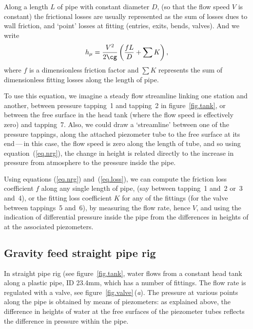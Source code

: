 \documentclass[a4paper,11pt]{article} \pagestyle{plain}
\begin{document}
Along a length $L$ of pipe with constant diameter $D$, (so that the
flow speed $V$ is constant) the frictional losses are usually
represented as the sum of losses dues to wall friction, and `point'
losses at fitting (entries, exits, bends, valves). And we write
\begin{equation}
h_\mu = \frac{V^2}{2\cg}\left(\frac{fL}{D}+\sum K\right),
\label{eq.loss}
\end{equation}
where $f$ is a dimensionless friction factor and $\sum K$ represents
the sum of dimensionless fitting losses along the length of pipe.

To use this equation, we imagine a steady flow streamline linking one
station and another, \eg between pressure tapping~1 and tapping~2 in
figure~\ref{fig.tank}, or between the free surface in the head tank
(where the flow speed is effectively zero) and tapping~7. Also, we
could draw a `streamline' between one of the pressure tappings, along
the attached piezometer tube to the free surface at its end\,---\,in
this case, the flow speed is zero along the length of tube, and so
using equation~(\ref{eq.nrg}), the change in height is related
directly to the increase in pressure from atmosphere to the pressure
inside the pipe.

Using equations (\ref{eq.nrg}) and~(\ref{eq.loss}), we can compute the
friction loss coefficient $f$ along any single length of pipe, (say
between tapping~1 and~2 or~3 and~4), or the fitting loss coefficient
$K$ for any of the fittings (\eg for the valve between tappings~5
and~6), by measuring the flow rate, hence $V$, and using the
indication of differential pressure inside the pipe from the
differences in heights of at the associated piezometers.

\subsection*{Gravity feed straight pipe rig}

In straight pipe rig (see figure~\ref{fig.tank}, water flows from a
constant head tank along a plastic pipe, ID 23.4mm, which has a number
of fittings. The flow rate is regulated with a valve, see
figure~\ref{fig.valve}\,(\textit{a}). The pressure at various points
along the pipe is obtained by means of piezometers: as explained
above, the difference in heights of water at the free surfaces of the
piezometer tubes reflects the difference in pressure within the pipe.
\end{document}
